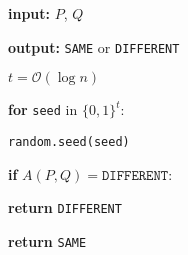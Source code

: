 \textbf{input:} $P$, $Q$

\textbf{output:} \texttt{SAME} or \texttt{DIFFERENT}

\medskip

$t = \mathcal O(\log n)$

\textbf{for} \texttt{seed} in $\{0, 1\}^t$:

\quad \texttt{random.seed(seed)}

\quad \textbf{if} $A(P, Q) = \texttt{DIFFERENT}$:

\quad\quad \textbf{return} \texttt{DIFFERENT}

\textbf{return} \texttt{SAME}
